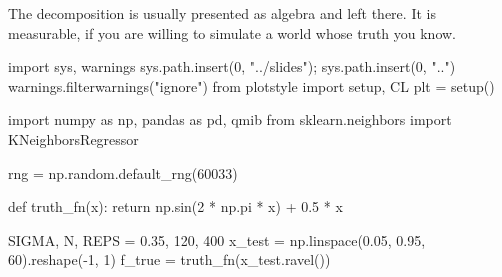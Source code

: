 \documentclass[
  letterpaper,
  10pt,
  twoside,
  openright,
  numbers=noenddot,
  chapterprefix=true]{scrbook}
\newenvironment{Shaded}{}{}
\newcommand{\ControlFlowTok}[1]{\textcolor[rgb]{0.84,0.23,0.29}{#1}}
\newcommand{\DecValTok}[1]{\textcolor[rgb]{0.00,0.36,0.77}{#1}}
\newcommand{\FloatTok}[1]{\textcolor[rgb]{0.00,0.36,0.77}{#1}}
\newcommand{\ImportTok}[1]{\textcolor[rgb]{0.01,0.18,0.38}{#1}}
\newcommand{\KeywordTok}[1]{\textcolor[rgb]{0.84,0.23,0.29}{#1}}
\newcommand{\NormalTok}[1]{\textcolor[rgb]{0.14,0.16,0.18}{#1}}
\newcommand{\OperatorTok}[1]{\textcolor[rgb]{0.14,0.16,0.18}{#1}}
\newcommand{\StringTok}[1]{\textcolor[rgb]{0.01,0.18,0.38}{#1}}
\begin{document}
The decomposition is usually presented as algebra and left there. It is
measurable, if you are willing to simulate a world whose truth you know.

\begin{Shaded}
\begin{Highlighting}[]
\ImportTok{import}\NormalTok{ sys, warnings}
\NormalTok{sys.path.insert(}\DecValTok{0}\NormalTok{, }\StringTok{"../slides"}\NormalTok{)}\OperatorTok{;}\NormalTok{ sys.path.insert(}\DecValTok{0}\NormalTok{, }\StringTok{".."}\NormalTok{)}
\NormalTok{warnings.filterwarnings(}\StringTok{"ignore"}\NormalTok{)}
\ImportTok{from}\NormalTok{ plotstyle }\ImportTok{import}\NormalTok{ setup, CL}
\NormalTok{plt }\OperatorTok{=}\NormalTok{ setup()}

\ImportTok{import}\NormalTok{ numpy }\ImportTok{as}\NormalTok{ np, pandas }\ImportTok{as}\NormalTok{ pd, qmib}
\ImportTok{from}\NormalTok{ sklearn.neighbors }\ImportTok{import}\NormalTok{ KNeighborsRegressor}

\NormalTok{rng }\OperatorTok{=}\NormalTok{ np.random.default\_rng(}\DecValTok{60033}\NormalTok{)}

\KeywordTok{def}\NormalTok{ truth\_fn(x):}
    \ControlFlowTok{return}\NormalTok{ np.sin(}\DecValTok{2} \OperatorTok{*}\NormalTok{ np.pi }\OperatorTok{*}\NormalTok{ x) }\OperatorTok{+} \FloatTok{0.5} \OperatorTok{*}\NormalTok{ x}

\NormalTok{SIGMA, N, REPS }\OperatorTok{=} \FloatTok{0.35}\NormalTok{, }\DecValTok{120}\NormalTok{, }\DecValTok{400}
\NormalTok{x\_test }\OperatorTok{=}\NormalTok{ np.linspace(}\FloatTok{0.05}\NormalTok{, }\FloatTok{0.95}\NormalTok{, }\DecValTok{60}\NormalTok{).reshape(}\OperatorTok{{-}}\DecValTok{1}\NormalTok{, }\DecValTok{1}\NormalTok{)}
\NormalTok{f\_true }\OperatorTok{=}\NormalTok{ truth\_fn(x\_test.ravel())}


\end{Highlighting}
\end{Shaded}
\end{document}
